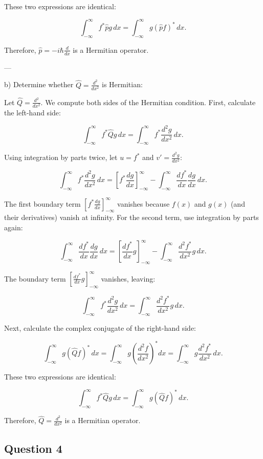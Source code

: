 \documentclass{article}
\begin{document}
These two expressions are identical:

\[
\int_{-\infty}^\infty f^* \hat{p} g \, dx = \int_{-\infty}^\infty g (\hat{p} f)^* \, dx.
\]

Therefore, \( \hat{p} = -i\hbar \frac{d}{dx} \) is a Hermitian operator. 

---

b) Determine whether \( \hat{Q} = \frac{d^2}{dx^2} \) is Hermitian:

Let \( \hat{Q} = \frac{d^2}{dx^2} \). We compute both sides of the Hermitian condition. First, calculate the left-hand side:

\[
\int_{-\infty}^\infty f^* \hat{Q} g \, dx = \int_{-\infty}^\infty f^* \frac{d^2 g}{dx^2} \, dx.
\]

Using integration by parts twice, let \( u = f^* \) and \( v' = \frac{d^2 g}{dx^2} \):

\[
\int_{-\infty}^\infty f^* \frac{d^2 g}{dx^2} \, dx = \left[ f^* \frac{dg}{dx} \right]_{-\infty}^\infty - \int_{-\infty}^\infty \frac{d f^*}{dx} \frac{dg}{dx} \, dx.
\]

The first boundary term \( \left[ f^* \frac{dg}{dx} \right]_{-\infty}^\infty \) vanishes because \( f(x) \) and \( g(x) \) (and their derivatives) vanish at infinity. For the second term, use integration by parts again:

\[
\int_{-\infty}^\infty \frac{d f^*}{dx} \frac{dg}{dx} \, dx = \left[ \frac{d f^*}{dx} g \right]_{-\infty}^\infty - \int_{-\infty}^\infty \frac{d^2 f^*}{dx^2} g \, dx.
\]

The boundary term \( \left[ \frac{d f^*}{dx} g \right]_{-\infty}^\infty \) vanishes, leaving:

\[
\int_{-\infty}^\infty f^* \frac{d^2 g}{dx^2} \, dx = \int_{-\infty}^\infty \frac{d^2 f^*}{dx^2} g \, dx.
\]

Next, calculate the complex conjugate of the right-hand side:

\[
\int_{-\infty}^\infty g (\hat{Q} f)^* \, dx = \int_{-\infty}^\infty g \left(\frac{d^2 f}{dx^2}\right)^* dx = \int_{-\infty}^\infty g \frac{d^2 f^*}{dx^2} \, dx.
\]

These two expressions are identical:

\[
\int_{-\infty}^\infty f^* \hat{Q} g \, dx = \int_{-\infty}^\infty g (\hat{Q} f)^* \, dx.
\]

Therefore, \( \hat{Q} = \frac{d^2}{dx^2} \) is a Hermitian operator.


\subsection{Question 4}
\end{document}

